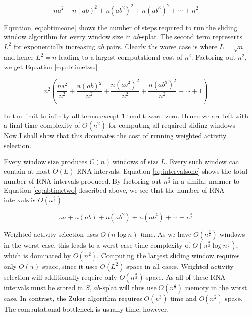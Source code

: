 \documentclass{cshonours}
\begin{document}
\begin{equation} \label{eq:abtimeone}
	n a^2 + n(a b)^2 + n(a b^2)^2 + n(a b^3)^2 + \cdots + n^2
\end{equation}

Equation \ref{eq:abtimeone} shows the number of steps required to run the sliding window algorithm for every window size in $ab$-splat. The second term represents $L^2$ for exponentially increasing $ab$ pairs. Clearly the worse case is where $L = \sqrt{n}$ and hence $L^2 = n$ leading to a largest computational cost of $n^2$. Factoring out $n^2$, we get Equation \ref{eq:abtimetwo}

\begin{equation} \label{eq:abtimetwo}
	n^2 ( \frac{n a^2}{n^2} + \frac{n(a b)^2}{n^2} + \frac{n(a b^2)^2}{n^2} + \frac{n(a b^3)^2}{n^2} + \cdots + 1)
\end{equation}

In the limit to infinity all terms except \texttt{1} tend toward zero. Hence we are left with a final time complexity of $O(n^2)$ for computing all required sliding windows. Now I shall show that this dominates the cost of running weighted activity selection.

Every window size produces $O(n)$ windows of size $L$. Every such window can contain at most $O(L)$ RNA intervals. Equation \ref{eq:intervalsone} shows the total number of RNA intervals produced. By factoring out $n^\frac{3}{2}$ in a similar manner to Equation \ref{eq:abtimetwo} described above, we see that the number of RNA intervals is $O(n^\frac{3}{2})$.


\begin{equation} \label{eq:intervalsone}
	n a + n(a b) + n(a b^2) + n(a b^3) + \cdots + n^\frac{3}{2}
\end{equation}

Weighted activity selection uses $O(n \log n)$ time. As we have $O(n^\frac{3}{2})$ windows in the worst case, this leads to a worst case time complexity of $O(n^\frac{3}{2} \log n^\frac{3}{2})$, which is dominated by $O(n^2)$. Computing the largest sliding window requires only $O(n)$ space, since it uses $O(L^2)$ space in all cases. Weighted activity selection will additionally require only $O(n^\frac{3}{2})$ space. As all of these RNA intervals must be stored in $S$, $ab$-splat will thus use $O(n^\frac{3}{2})$ memory in the worst case. In contrast, the Zuker algorithm requires $O(n^3)$ time and $O(n^2)$ space. The computational bottleneck is usually time, however. 
\end{document}
